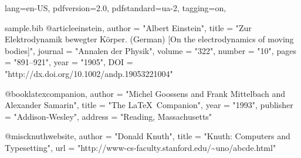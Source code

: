 \DocumentMetadata
  {
    lang=en-US,
    pdfversion=2.0,
    pdfstandard=ua-2,
    tagging=on,
  }
\begin{filecontents}[overwrite]{sample.bib}
@article{einstein,
  author =       "Albert Einstein",
  title =        "{Zur Elektrodynamik bewegter K{\"o}rper}. ({German})
                 [{On} the electrodynamics of moving bodies]",
  journal =      "Annalen der Physik",
  volume =       "322",
  number =       "10",
  pages =        "891--921",
  year =         "1905",
  DOI =          "http://dx.doi.org/10.1002/andp.19053221004"
}

@book{latexcompanion,
    author    = "Michel Goossens and Frank Mittelbach and Alexander Samarin",
    title     = "The \LaTeX\ Companion",
    year      = "1993",
    publisher = "Addison-Wesley",
    address   = "Reading, Massachusetts"
}

@misc{knuthwebsite,
    author    = "Donald Knuth",
    title     = "Knuth: Computers and Typesetting",
    url       = "http://www-cs-faculty.stanford.edu/\~{}uno/abcde.html"
}
\end{filecontents}

\documentclass{article}
\usepackage{natbib}
\usepackage{har2nat}
\usepackage{hyperref}



text \cite{einstein}

As  and  describe \ldots

manuals  describe \ldots

\citeyear{latexcompanion}


\medskip






